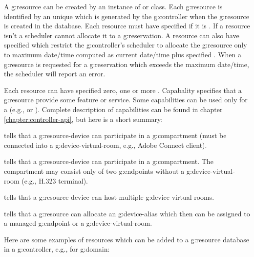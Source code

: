 A \gls{g:resource} can be created by an instance of  or  class. Each \gls{g:resource} is identified by an unique  which is generated by the \gls{g:controller} when the \gls{g:resource} is created in the database. Each resource must have specified if it is . If a resource isn't  a scheduler cannot allocate it to a \gls{g:reservation}. A resource can also have specified  which restrict the \gls{g:controller}'s scheduler to allocate the \gls{g:resource} only to maximum date/time computed as current date/time plus specified . When a \gls{g:resource} is requested for a \gls{g:reservation} which exceeds the maximum date/time, the scheduler will report an error.

Each resource can have specified zero, one or more . Capabality specifies that a \gls{g:resource} provide some feature or service. Some capabilities can be used only for a  (e.g.,  or ). Complete description of capabilities can be found in chapter \ref{chapter:controller-api}, but here is a short summary:
\begin{compactitem}
\item {} tells that a \gls{g:resource-device} can participate in a \gls{g:compartment} (must be connected into a \gls{g:device-virtual-room}, e.g., Adobe Connect client).
\item {} tells that a \gls{g:resource-device} can participate in a \gls{g:compartment}. The compartment may consist only of two \glspl{g:endpoint} without a \gls{g:device-virtual-room} (e.g., H.323 terminal).
\item {} tells that a \gls{g:resource-device} can host multiple \glspl{g:device-virtual-room}.
\item {} tells that a \gls{g:resource} can allocate an \gls{g:device-alias} which then can be assigned to a managed \gls{g:endpoint} or a \gls{g:device-virtual-room}.
\end{compactitem}

Here are some examples of resources which can be added to a \gls{g:resource} database in a \gls{g:controller}, e.g., for  \gls{g:domain}:

